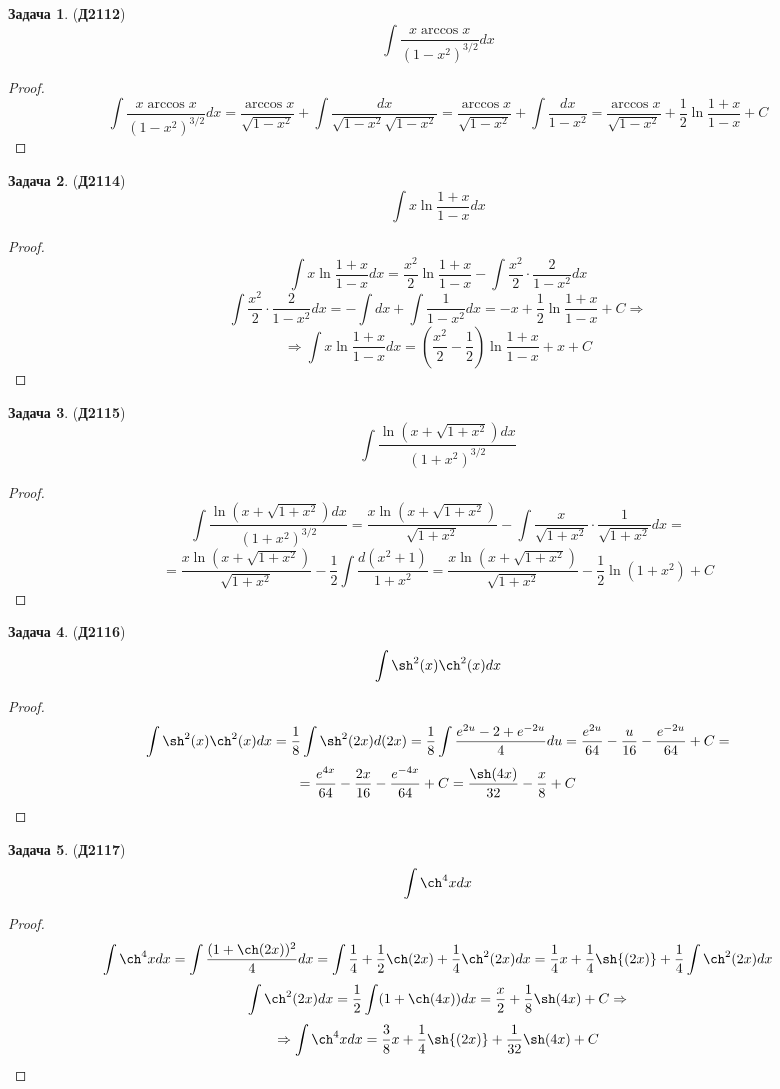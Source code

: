 \documentclass[12pt]{article}
\theoremstyle{definition}
\newtheorem{problem}{Задача}
\DeclareMathOperator{\dint}{\displaystyle\int}
\begin{document}
\begin{problem}(\textbf{Д2112})
	$$
		\dint \dfrac{x\arccos{x}}{(1 - x^2)^{3/2}}dx
	$$
\end{problem}
\begin{proof}
	$$
		\dint \dfrac{x\arccos{x}}{(1 - x^2)^{3/2}}dx = \dfrac{\arccos{x}}{\sqrt{1 - x^2}} + \dint \dfrac{dx}{\sqrt{1 - x^2}\sqrt{1 - x^2}} = \dfrac{\arccos{x}}{\sqrt{1 - x^2}}  +  \dint \dfrac{dx}{1 -x^2} = \dfrac{\arccos{x}}{\sqrt{1 - x^2}}  + \dfrac{1}{2}\ln\dfrac{1 + x}{1-x} + C
	$$

\end{proof}

\begin{problem}(\textbf{Д2114})
	$$
		\dint x \ln\dfrac{1 + x}{1-x}dx
	$$
\end{problem}
\begin{proof}
	$$
		\dint x \ln\dfrac{1 + x}{1-x}dx = \dfrac{x^2}{2}\ln\dfrac{1 + x}{1-x} - \dint \dfrac{x^2}{2}{\cdot}\dfrac{2}{1 -x^2}dx 
	$$
	$$
		\dint \dfrac{x^2}{2}{\cdot}\dfrac{2}{1 -x^2}dx  =-\dint dx + \dint\dfrac{1}{1-x^2}dx = - x + \dfrac{1}{2}\ln\dfrac{1+ x}{1 - x} + C \Rightarrow
	$$
	$$
		\Rightarrow \dint x \ln\dfrac{1 + x}{1-x}dx = \left(\dfrac{x^2}{2} - \dfrac{1}{2}\right)\ln\dfrac{1 + x}{1-x}  + x + C
	$$
\end{proof}
\begin{problem}(\textbf{Д2115})
	$$
		\dint \dfrac{\ln(x + \sqrt{1 + x^2})dx}{(1 + x^2)^{3/2}}
	$$
\end{problem}
\begin{proof}
	$$
		\dint \dfrac{\ln(x + \sqrt{1 + x^2})dx}{(1 + x^2)^{3/2}} = \dfrac{x\ln(x + \sqrt{1 + x^2})}{\sqrt{1+ x^2}} - \dint \dfrac{x}{\sqrt{1 + x^2}}{\cdot}\dfrac{1}{\sqrt{1 + x^2}}dx = 
	$$
	$$	
		=\dfrac{x\ln(x + \sqrt{1 + x^2})}{\sqrt{1+ x^2}} - \dfrac{1}{2}\dint \dfrac{d(x^2 + 1)}{1 + x^2} = \dfrac{x\ln(x + \sqrt{1 + x^2})}{\sqrt{1+ x^2}} - \dfrac{1}{2}\ln(1 + x^2) +C
	$$
\end{proof}
\begin{problem}(\textbf{Д2116})
	$$
		\dint \sh^2(x)\ch^2(x)dx
	$$
\end{problem}
\begin{proof}
	$$
		\dint \sh^2(x)\ch^2(x)dx = \dfrac{1}{8}\dint \sh^2(2x) d(2x) = \dfrac{1}{8}\dint \dfrac{e^{2u} -2 + e^{-2u}}{4}du = \dfrac{e^{2u}}{64} - \dfrac{u}{16} - \dfrac{e^{-2u}}{64} + C= 
	$$
	$$
		=	\dfrac{e^{4x}}{64} - \dfrac{2x}{16} - \dfrac{e^{-4x}}{64} + C =  \dfrac{\sh(4x)}{32} - \dfrac{x}{8} + C
	$$
\end{proof}
\begin{problem}(\textbf{Д2117})
	$$
		\dint \ch^4{x} dx
	$$
\end{problem}
\begin{proof}
	$$
		\dint \ch^4{x} dx = \dint \dfrac{(1 + \ch(2x))^2}{4}dx = \dint \dfrac{1}{4} + \dfrac{1}{2}\ch(2x) + \dfrac{1}{4}\ch^2(2x)dx = \dfrac{1}{4}x + \dfrac{1}{4}\sh{(2x)} + \dfrac{1}{4}\dint \ch^2(2x)dx
	$$
	$$
		\dint \ch^2(2x)dx = \dfrac{1}{2}\dint (1 + \ch(4x))dx = \dfrac{x}{2} + \dfrac{1}{8}\sh(4x) + C \Rightarrow
	$$
	$$
		\Rightarrow \dint \ch^4{x} dx = \dfrac{3}{8}x + \dfrac{1}{4}\sh{(2x)} + \dfrac{1}{32}\sh(4x) + C 
	$$
\end{proof}
\end{document}
